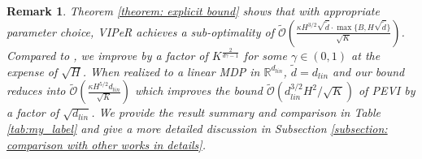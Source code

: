 \documentclass{article} \usepackage{iclr2023/iclr2023_conference,times}
\newtheorem{remark}{Remark}
\begin{document}
\begin{remark}
Theorem \ref{theorem: explicit bound} shows that with appropriate parameter choice, VIPeR achieves a sub-optimality of  $\tilde{\mathcal{O}}\left(  \frac{ \kappa H^{3/2} \sqrt{\tilde{d}} \cdot \max\{ B, H \sqrt{ \tilde{d} } \} }{\sqrt{K}} \right)$.
Compared to \cite{yang2020function}, we improve by a factor of $K^{\frac{2}{d \gamma - 1}}$ for some $\gamma \in (0,1)$ at the expense of $\sqrt{H}$. When realized to a linear MDP in $\mathbb{R}^{d_{lin}}$, $\tilde{d} = d_{lin}$ and our bound reduces into $\tilde{\mathcal{O}}\left(  \frac{\kappa H^{5/2}  d_{lin} }{\sqrt{K}} \right)$ which improves the bound $\tilde{\mathcal{O}}(d^{3/2}_{lin} H^2 / \sqrt{K})$ of PEVI \citep[Corollary~4.6]{jin2021pessimism} by a factor of $\sqrt{d_{lin}}$. We provide the result summary and comparison in Table \ref{tab:my_label} and give a more detailed discussion in Subsection \ref{subsection: comparison with other works in details}. 
\end{remark}
\end{document}
